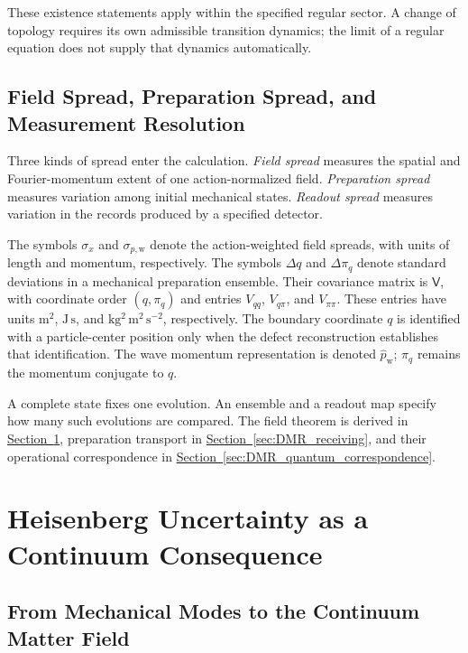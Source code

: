 These existence statements apply within the specified regular sector. A change of topology requires its own admissible transition dynamics; the limit of a regular equation does not supply that dynamics automatically.

\subsection{Field Spread, Preparation Spread, and Measurement Resolution}

Three kinds of spread enter the calculation. \emph{Field spread} measures the spatial and Fourier-momentum extent of one action-normalized field. \emph{Preparation spread} measures variation among initial mechanical states. \emph{Readout spread} measures variation in the records produced by a specified detector.

The symbols $\sigma_x$ and $\sigma_{p,\mathrm w}$ denote the action-weighted field spreads, with units of length and momentum, respectively. The symbols $\Delta q$ and $\Delta \pi_q$ denote standard deviations in a mechanical preparation ensemble. Their covariance matrix is $\mathsf V$, with coordinate order $(q,\pi_q)$ and entries $V_{qq}$, $V_{q\pi}$, and $V_{\pi\pi}$. These entries have units $\mathrm{m^2}$, $\mathrm{J\,s}$, and $\mathrm{kg^2\,m^2\,s^{-2}}$, respectively. The boundary coordinate $q$ is identified with a particle-center position only when the defect reconstruction establishes that identification. The wave momentum representation is denoted $\widehat p_{\mathrm w}$; $\pi_q$ remains the momentum conjugate to $q$.

A complete state fixes one evolution. An ensemble and a readout map specify how many such evolutions are compared. The field theorem is derived in \hyperref[sec:DMR_heisenberg]{Section~\ref*{sec:DMR_heisenberg}}, preparation transport in \hyperref[sec:DMR_receiving]{Section~\ref*{sec:DMR_receiving}}, and their operational correspondence in \hyperref[sec:DMR_quantum_correspondence]{Section~\ref*{sec:DMR_quantum_correspondence}}.

\section{Heisenberg Uncertainty as a Continuum Consequence}
\label{sec:DMR_heisenberg}

\subsection{From Mechanical Modes to the Continuum Matter Field}

